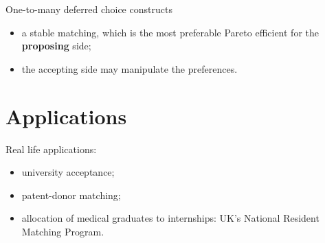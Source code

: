 \documentclass[a4paper]{article}
\begin{document}
One-to-many deferred choice constructs
\begin{itemize}
	\item a stable matching, which is the most preferable Pareto efficient for the \textbf{proposing} side;
	\item the accepting side may manipulate the preferences.
\end{itemize}


\section{Applications} %
\label{sec:applications}

Real life applications:
\begin{itemize}
	\item university acceptance;
	\item patent-donor matching;
	\item allocation of medical graduates to internships: UK's National Resident Matching Program.
\end{itemize}

\end{document}
